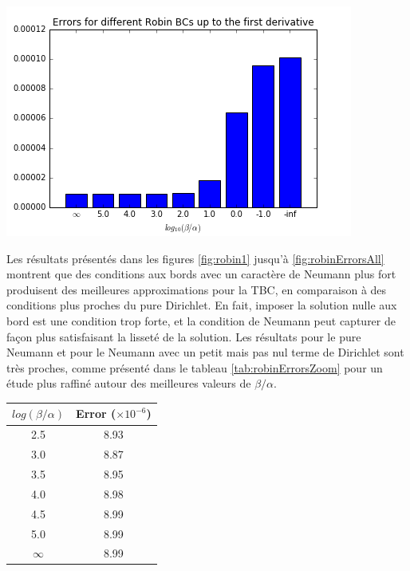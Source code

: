 \begingroup
\begin{center}
		\includegraphics[scale=.6]{figures/robinErrors1.png}
\end{center}
\endgroup

\indent Les résultats présentés dans les figures \ref{fig:robin1} jusqu'à \ref{fig:robinErrorsAll} montrent que des conditions aux bords avec un caractère de Neumann plus fort produisent des meilleures approximations pour la TBC, en comparaison à des conditions plus proches du pure Dirichlet. En fait, imposer la solution nulle aux bord est une condition trop forte, et la condition de Neumann peut capturer de façon plus satisfaisant la lisseté de la solution. Les résultats pour le pure Neumann et pour le Neumann avec un petit mais pas nul terme de Dirichlet sont très proches, comme présenté dans le tableau \ref{tab:robinErrorsZoom} pour un étude plus raffiné autour des meilleures valeurs de $\beta/\alpha$.

\begingroup
\begin{center}
		\begin{tabular}{c|c}
			$log(\beta/\alpha)$ & Error ($\times 10^{-6}$) \\
			\hline
			2.5 & 8.93\\
			3.0 & 8.87\\
			3.5 & 8.95\\
			4.0 & 8.98\\
			4.5 & 8.99\\
			5.0 & 8.99\\
			$\infty$ & 8.99	
		\end{tabular}
\end{center}
\endgroup

